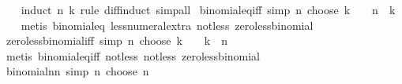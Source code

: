 \begin{isabellebody}
%
\isadelimproof
\ \ %
\endisadelimproof
%
\isatagproof
{}\isamarkupfalse%
\ {\isacharparenleft}{\kern0pt}induct\ n\ k\ rule{\isacharcolon}{\kern0pt}\ diff{\isacharunderscore}{\kern0pt}induct{\isacharparenright}{\kern0pt}\ simp{\isacharunderscore}{\kern0pt}all%
\endisatagproof
{\isafoldproof}%
%
\isadelimproof
\isanewline
%
\endisadelimproof
\isanewline
{}\isamarkupfalse%
\ binomial{\isacharunderscore}{\kern0pt}eq{\isacharunderscore}{\kern0pt}{}{\isacharunderscore}{\kern0pt}iff\ {\isacharbrackleft}{\kern0pt}simp{\isacharbrackright}{\kern0pt}{\isacharcolon}{\kern0pt}\ {\isachardoublequoteopen}n\ choose\ k\ {\isacharequal}{\kern0pt}\ {}\ {\isasymlongleftrightarrow}\ n\ {\isacharless}{\kern0pt}\ k{\isachardoublequoteclose}\isanewline
%
\isadelimproof
\ \ %
\endisadelimproof
%
\isatagproof
{}\isamarkupfalse%
\ {\isacharparenleft}{\kern0pt}metis\ binomial{\isacharunderscore}{\kern0pt}eq{\isacharunderscore}{\kern0pt}{}\ less{\isacharunderscore}{\kern0pt}numeral{\isacharunderscore}{\kern0pt}extra{\isacharparenleft}{\kern0pt}{}{\isacharparenright}{\kern0pt}\ not{\isacharunderscore}{\kern0pt}less\ zero{\isacharunderscore}{\kern0pt}less{\isacharunderscore}{\kern0pt}binomial{\isacharparenright}{\kern0pt}%
\endisatagproof
{\isafoldproof}%
%
\isadelimproof
\isanewline
%
\endisadelimproof
\isanewline
{}\isamarkupfalse%
\ zero{\isacharunderscore}{\kern0pt}less{\isacharunderscore}{\kern0pt}binomial{\isacharunderscore}{\kern0pt}iff\ {\isacharbrackleft}{\kern0pt}simp{\isacharbrackright}{\kern0pt}{\isacharcolon}{\kern0pt}\ {\isachardoublequoteopen}n\ choose\ k\ {\isachargreater}{\kern0pt}\ {}\ {\isasymlongleftrightarrow}\ k\ {\isasymle}\ n{\isachardoublequoteclose}\isanewline
%
\isadelimproof
\ \ %
\endisadelimproof
%
\isatagproof
{}\isamarkupfalse%
\ {\isacharparenleft}{\kern0pt}metis\ binomial{\isacharunderscore}{\kern0pt}eq{\isacharunderscore}{\kern0pt}{}{\isacharunderscore}{\kern0pt}iff\ not{\isacharunderscore}{\kern0pt}less{}\ not{\isacharunderscore}{\kern0pt}less\ zero{\isacharunderscore}{\kern0pt}less{\isacharunderscore}{\kern0pt}binomial{\isacharparenright}{\kern0pt}%
\endisatagproof
{\isafoldproof}%
%
\isadelimproof
\isanewline
%
\endisadelimproof
\isanewline
{}\isamarkupfalse%
\ binomial{\isacharunderscore}{\kern0pt}n{\isacharunderscore}{\kern0pt}n\ {\isacharbrackleft}{\kern0pt}simp{\isacharbrackright}{\kern0pt}{\isacharcolon}{\kern0pt}\ {\isachardoublequoteopen}n\ choose\ n\ {\isacharequal}{\kern0pt}\ {}{\isachardoublequoteclose}\isanewline

\end{isabellebody}
